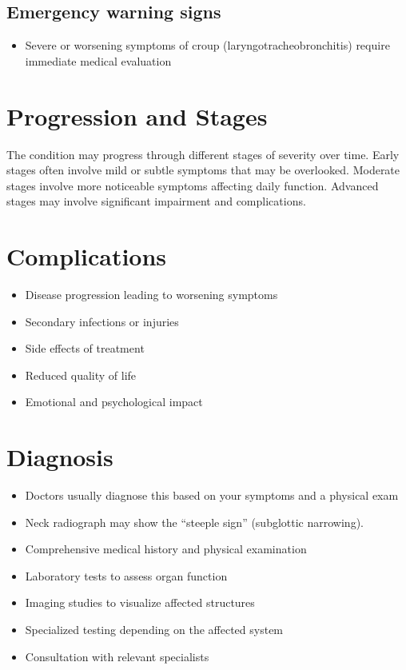 \subsection{Emergency warning signs}
\begin{itemize}[noitemsep]
  \item Severe or worsening symptoms of croup (laryngotracheobronchitis) require immediate medical evaluation
\end{itemize}
\section{Progression and Stages}
The condition may progress through different stages of severity over time. Early stages often involve mild or subtle symptoms that may be overlooked. Moderate stages involve more noticeable symptoms affecting daily function. Advanced stages may involve significant impairment and complications.
\section{Complications}
\begin{itemize}[noitemsep]
  \item Disease progression leading to worsening symptoms
  \item Secondary infections or injuries
  \item Side effects of treatment
  \item Reduced quality of life
  \item Emotional and psychological impact
\end{itemize}
\section{Diagnosis}
\begin{itemize}[noitemsep]
  \item Doctors usually diagnose this based on your symptoms and a physical exam
  \item Neck radiograph may show the ``steeple sign'' (subglottic narrowing).
  \item Comprehensive medical history and physical examination
  \item Laboratory tests to assess organ function
  \item Imaging studies to visualize affected structures
  \item Specialized testing depending on the affected system
  \item Consultation with relevant specialists
\end{itemize}
